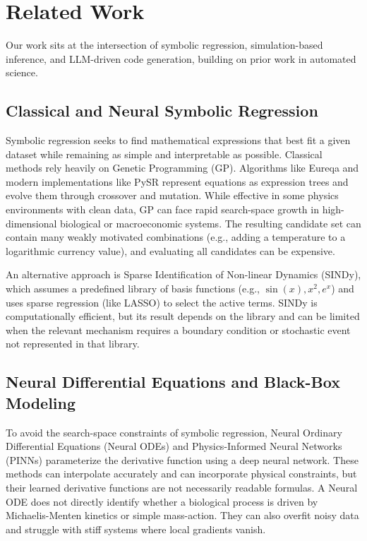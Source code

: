 \section{Related Work}
\label{sec:related}

Our work sits at the intersection of symbolic regression, simulation-based inference, and LLM-driven code generation, building on prior work in automated science.

\subsection{Classical and Neural Symbolic Regression}
Symbolic regression seeks to find mathematical expressions that best fit a given dataset while remaining as simple and interpretable as possible. Classical methods rely heavily on Genetic Programming (GP). Algorithms like Eureqa and modern implementations like PySR represent equations as expression trees and evolve them through crossover and mutation. While effective in some physics environments with clean data, GP can face rapid search-space growth in high-dimensional biological or macroeconomic systems. The resulting candidate set can contain many weakly motivated combinations (e.g., adding a temperature to a logarithmic currency value), and evaluating all candidates can be expensive.

An alternative approach is Sparse Identification of Non-linear Dynamics (SINDy), which assumes a predefined library of basis functions (e.g., $\sin(x), x^2, e^x$) and uses sparse regression (like LASSO) to select the active terms. SINDy is computationally efficient, but its result depends on the library and can be limited when the relevant mechanism requires a boundary condition or stochastic event not represented in that library.

\subsection{Neural Differential Equations and Black-Box Modeling}
To avoid the search-space constraints of symbolic regression, Neural Ordinary Differential Equations (Neural ODEs) and Physics-Informed Neural Networks (PINNs) parameterize the derivative function using a deep neural network. These methods can interpolate accurately and can incorporate physical constraints, but their learned derivative functions are not necessarily readable formulas. A Neural ODE does not directly identify whether a biological process is driven by Michaelis-Menten kinetics or simple mass-action. They can also overfit noisy data and struggle with stiff systems where local gradients vanish.

